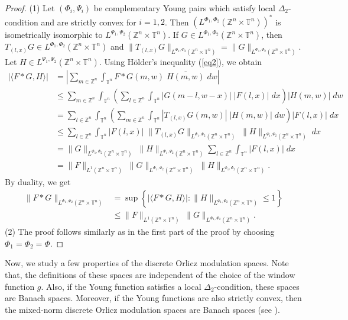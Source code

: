 \documentclass[a4paper,11pt, reqno]{amsart}
\theoremstyle{plain}
\theoremstyle{definition}
\theoremstyle{remark}
\def \Z{{\mathbb Z}}
\def \T{{\mathbb T}}
\begin{document}
\begin{proof}
(1) Let $\left(\Phi_i, \Psi_i \right)$ be complementary Young pairs which satisfy local $\Delta_2$-condition and are strictly convex for $i = 1, 2$. Then $\left(L^{\Phi_1, \Phi_2} (\Z^n \times \T^n)\right)^*$ is isometrically isomorphic to  $L^{\Psi_1, \Psi_2} (\Z^n \times \T^n)$. If $G \in L^{\Phi_1, \Phi_2} (\Z^n \times \T^n)$, then $T_{(l,x)} G \in L^{\Phi_1, \Phi_2} (\Z^n \times \T^n)$ and $\| T_{(l,x)} G \|_{L^{\Phi_1, \Phi_2} (\Z^n \times \T^n)}= \| G \|_{L^{\Phi_1, \Phi_2} (\Z^n \times \T^n)}$. Let $H \in  L^{\Psi_1, \Psi_2} (\Z^n \times \T^n)$. Using H\"older's inequality (\ref{eq2}), we obtain
\begin{align*}
|\langle F * G, H \rangle| 
& = \left| \sum_{m \in \Z^n}  \int_{\T^n} F*G(m,w) \; \overline{H(m,w)} \; dw \right| \\
& \leq \sum_{m \in \Z^n}  \int_{\T^n} \left( \sum_{l \in \Z^n}  \int_{\T^n} \left| G(m-l, w-x) \right|\; |F(l,x)| \; dx \right) |H(m,w)| \; dw \\
& =  \sum_{l \in \Z^n}  \int_{\T^n} \left( \sum_{m \in \Z^n}  \int_{\T^n} \left| T_{(l,x)} G(m, w) \right|\; |H(m,w)| \; dw \right) |F(l,x)| \; dx  \\
& \leq \sum_{l \in \Z^n}  \int_{\T^n}  |F(l,x)| \; \| T_{(l,x)} G \|_{L^{\Phi_1, \Phi_2} (\Z^n \times \T^n)} \; \|H\|_{L^{\Psi_1, \Psi_2} (\Z^n \times \T^n)} \; dx \\
& = \| G \|_{L^{\Phi_1, \Phi_2} (\Z^n \times \T^n)} \; \|H\|_{L^{\Psi_1, \Psi_2} (\Z^n \times \T^n)} \sum_{l \in \Z^n} \int_{\T^n} |F(l,x)| \; dx \\
& = \|F\|_{L^1(\Z^n \times \T^n)} \; \| G \|_{L^{\Phi_1, \Phi_2} (\Z^n \times \T^n)} \; \|H\|_{L^{\Psi_1, \Psi_2} (\Z^n \times \T^n)}.
\end{align*}
By duality, we get
\begin{align*}
\|F * G\|_{L^{\Phi_1, \Phi_2} (\Z^n \times \T^n)} 
& = \sup\left\{|\langle F * G, H \rangle|:\|H\|_{L^{\Psi_1, \Psi_2} (\Z^n \times \T^n)}  \leq 1 \right\} \\
& \leq \|F\|_{L^1(\Z^n \times \T^n)} \; \|G\|_{L^{\Phi_1, \Phi_2} (\Z^n \times \T^n)}.
\end{align*}
(2) The proof follows similarly as in the first part of the proof by choosing $\Phi_1 = \Phi_2 = \Phi$.
\end{proof}
Now, we study a few properties of the discrete Orlicz modulation spaces. Note that, the definitions of these spaces are independent of the choice of the window function $g$. Also, if the Young function satisfies a local $\Delta_2$-condition, these spaces are Banach spaces. Moreover, if the Young functions are also strictly convex, then the mixed-norm discrete Orlicz modulation spaces are Banach spaces (see \cite[Theorems 6 and 7]{sch13}).
\end{document}
